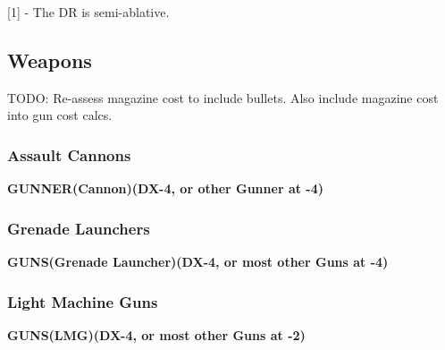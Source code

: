 [1] - The DR is semi-ablative.

\subsection{Weapons}

TODO: Re-assess magazine cost to include bullets. Also include magazine cost into gun cost calcs.

\subsubsection{Assault Cannons}
\textbf{GUNNER(Cannon)(DX-4, or other Gunner at -4)}
\begin{center} 
	\begin{adjustwidth}{-8mm}{}
	\end{adjustwidth}
\end{center}

\subsubsection{Grenade Launchers}
\textbf{GUNS(Grenade Launcher)(DX-4, or most other Guns at -4)}
\begin{center} 
	\begin{adjustwidth}{-8mm}{}
	\end{adjustwidth}
\end{center}

\subsubsection{Light Machine Guns}
\textbf{GUNS(LMG)(DX-4, or most other Guns at -2)}
\begin{center} 
	\begin{adjustwidth}{-8mm}{}
	\end{adjustwidth}
\end{center}


